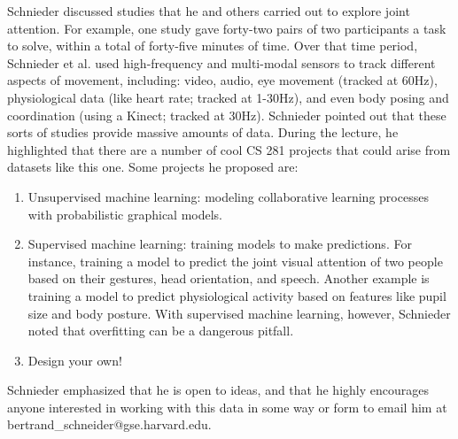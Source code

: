 \documentclass{article}
\begin{document}
Schnieder discussed studies that he and others carried out to explore joint attention. For example, one study gave forty-two pairs of two participants a task to solve, within a total of forty-five minutes of time. Over that time period, Schnieder et al. used high-frequency and multi-modal sensors to track different aspects of movement, including: video, audio, eye movement (tracked at 60Hz), physiological data (like heart rate; tracked at 1-30Hz), and even body posing and coordination (using a Kinect; tracked at 30Hz). Schnieder pointed out that these sorts of studies provide massive amounts of data. During the lecture, he highlighted that there are a number of cool CS 281 projects that could arise from datasets like this one. Some projects he proposed are:
\begin{enumerate}

\item Unsupervised machine learning: modeling collaborative learning processes with probabilistic graphical models.
\item Supervised machine learning: training models to make predictions. For instance, training a model to predict the joint visual attention of two people based on their gestures, head orientation, and speech. Another example is training a model to predict physiological activity based on features like pupil size and body posture. With supervised machine learning, however, Schnieder noted that overfitting can be a dangerous pitfall.
\item Design your own!

\end{enumerate}

Schnieder emphasized that he is open to ideas, and that he highly encourages anyone interested in working with this data in some way or form to email him at bertrand\_schneider@gse.harvard.edu.
\end{document}
